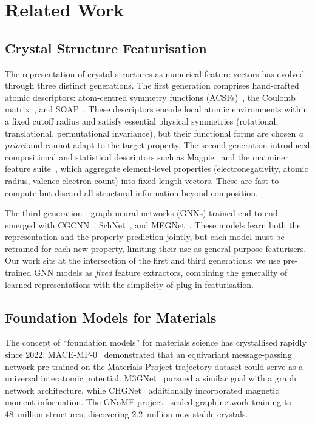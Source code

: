 \section{Related Work}
\label{sec:related_work}

\subsection{Crystal Structure Featurisation}

The representation of crystal structures as numerical feature vectors has evolved through three distinct generations.
The first generation comprises hand-crafted atomic descriptors: atom-centred symmetry functions (ACSFs)~\cite{behler2011atom}, the Coulomb matrix~\cite{rupp2012fast}, and SOAP~\cite{bartok2013representing}.
These descriptors encode local atomic environments within a fixed cutoff radius and satisfy essential physical symmetries (rotational, translational, permutational invariance), but their functional forms are chosen \emph{a priori} and cannot adapt to the target property.
The second generation introduced compositional and statistical descriptors such as Magpie~\cite{ward2016general} and the matminer feature suite~\cite{ward2018matminer}, which aggregate element-level properties (electronegativity, atomic radius, valence electron count) into fixed-length vectors.
These are fast to compute but discard all structural information beyond composition.

The third generation---graph neural networks (GNNs) trained end-to-end---emerged with CGCNN~\cite{xie2018crystal}, SchNet~\cite{schutt2018schnet}, and MEGNet~\cite{chen2019graph}.
These models learn both the representation and the property prediction jointly, but each model must be retrained for each new property, limiting their use as general-purpose featurisers.
Our work sits at the intersection of the first and third generations: we use pre-trained GNN models as \emph{fixed} feature extractors, combining the generality of learned representations with the simplicity of plug-in featurisation.


\subsection{Foundation Models for Materials}

The concept of ``foundation models'' for materials science has crystallised rapidly since 2022.
MACE-MP-0~\cite{batatia2022mace,batatia2024foundation} demonstrated that an equivariant message-passing network pre-trained on the Materials Project trajectory dataset could serve as a universal interatomic potential.
M3GNet~\cite{chen2022m3gnet} pursued a similar goal with a graph network architecture, while CHGNet~\cite{deng2023chgnet} additionally incorporated magnetic moment information.
The GNoME project~\cite{merchant2023scaling} scaled graph network training to 48~million structures, discovering 2.2~million new stable crystals.

